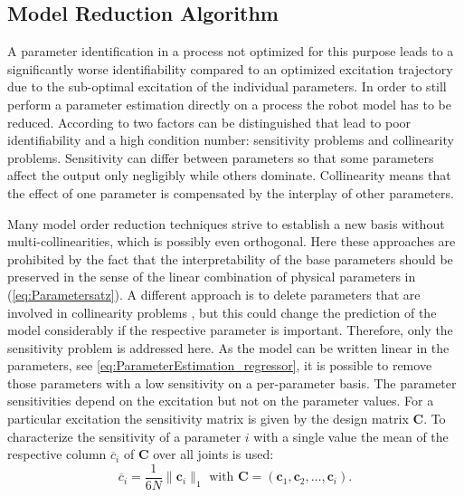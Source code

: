 \subsection{Model Reduction Algorithm}
A parameter identification in a process not optimized for this purpose leads to a significantly worse identifiability compared to an optimized excitation trajectory due to the sub-optimal excitation of the individual parameters.
In order to still perform a parameter estimation directly on a process the robot model has to be reduced.
According to \cite{Brun2001} two factors can be distinguished that lead to poor identifiability and a high condition number: sensitivity problems and collinearity problems. 
Sensitivity can differ between parameters so that some parameters affect the output only negligibly while others dominate. Collinearity means that the effect of one parameter is compensated by the interplay of other parameters.

Many model order reduction techniques strive to establish a new basis without multi-collinearities, which is possibly even orthogonal. 
Here these approaches are prohibited by the fact that the interpretability of the base parameters should be preserved in the sense of the linear combination of physical parameters in (\ref{eq:Parametersatz}). 
A different approach is to delete parameters that are involved in collinearity problems \cite{Akinniyi2017}, but this could change the prediction of the model considerably if the respective parameter is important. Therefore, only the sensitivity problem is addressed here. As the model can be written linear in the parameters, see \eqref{eq:ParameterEstimation_regressor}, it is possible to remove those parameters with a low sensitivity on a per-parameter basis. The parameter sensitivities depend on the excitation but not on the parameter values. For a particular excitation the sensitivity matrix is given by the design matrix $\boldsymbol{C}$. To characterize the sensitivity of a parameter $i$ with a single value the mean of the respective column $\overline{c}_i$ of $\boldsymbol{C}$ over all joints is used:
\begin{equation}\label{eq:mean_Sensitivity}
	\overline{c}_i = \frac{1}{6N} \| \boldsymbol{c}_i \|_1 \text{ with } \boldsymbol{C} = (\boldsymbol{c}_1, \boldsymbol{c}_2, \hdots, \boldsymbol{c}_i).
\end{equation}

